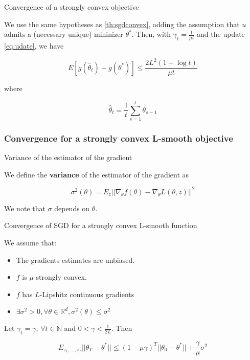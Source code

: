 \documentclass[
10pt, %
a4paper, %
oneside, %
headinclude,footinclude, %
BCOR5mm, %
]{scrartcl}
\begin{document}
\begin{theorem}{Convergence of a strongly convex objective}

    We use the same hypotheses as \ref{th:sgdconvex}, adding the assumption
    that $u$ admits a (necessary unique) mininizer $\theta^*$. Then, with
    $\gamma_t =  \frac{1}{\mu t} $ and the update \ref{eq:udate}, we have

    \begin{equation}
	E[g( \hat{\theta}_t)-g(\theta^*)]\leq \frac{2L^2 (1+\log t)}{\mu t} 
    \end{equation}

    where 

    \begin{equation}
	\hat{\theta}_t = \frac{1}{t} \sum^{t}_{s=1} \theta_{s-1}
    \end{equation}

\end{theorem}

\subsubsection{\large\color{Periwinkle}Convergence for a strongly convex L-smooth objective}

\begin{definition}{Variance of the estimator of the gradient}

    We define the \textbf{{variance}} of the estimator of the gradient as

    \begin{equation}
	\sigma^2(\theta) = E_{z}|| \nabla_{\theta} f(\theta)- \nabla_{\theta}L(\theta, z)||^2
    \end{equation}

    We note that $\sigma $ depends on $ \theta$.
    
\end{definition}

\begin{theorem}{Convergence of SGD for a strongly convex L-smooth function}
    
    We assume that:
    \begin{itemize}
	\item The gradients estimates are unbiased.
        \item $f$ is $\mu$ strongly convex.
	\item $f$ has $L$-Lipshitz continuous gradients
	\item $\exists \sigma^2>0, \forall \theta \in \mathbb{R}^d, \sigma^2(\theta)\leq \sigma^2$
    \end{itemize}
    Let $\gamma_t = \gamma$, $\forall t\in \mathbb{N} $ and $ 0<\gamma < \frac{1}{2L} $. Then

    \begin{equation}
	E_{z_1, \dots, z_T}||\theta_T-\theta^*||\leq (1-\mu\gamma)^T||\theta_0-\theta^*|| + \frac{ \gamma}{\mu} \sigma^2
    \end{equation}
\end{theorem}
\end{document}
